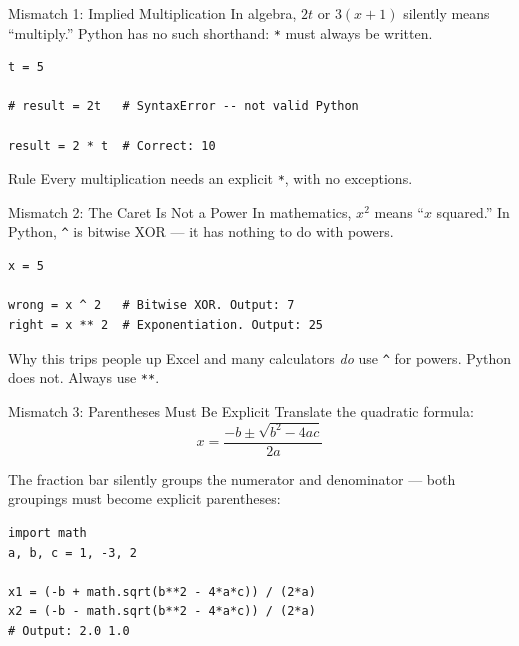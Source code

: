 \documentclass[9pt,aspectratio=169,xcolor=table]{beamer}
\begin{document}
\begin{frame}[fragile]{Mismatch 1: Implied Multiplication}
    \leavevmode
    In algebra, $2t$ or $3(x+1)$ silently means ``multiply.'' Python has
    \alert{no such shorthand}: \texttt{*} must always be written.

\begin{lstlisting}
t = 5

# result = 2t   # SyntaxError -- not valid Python

result = 2 * t  # Correct: 10
\end{lstlisting}

    \vspace{2mm}
    \begin{alertblock}{Rule}
        Every multiplication needs an explicit \texttt{*}, with no
        exceptions.
    \end{alertblock}
\end{frame}

\begin{frame}[fragile]{Mismatch 2: The Caret Is Not a Power}
    \leavevmode
    In mathematics, $x^2$ means ``$x$ squared.'' In Python, \texttt{\^{}}
    is \alert{bitwise XOR} --- it has nothing to do with powers.

\begin{lstlisting}
x = 5

wrong = x ^ 2   # Bitwise XOR. Output: 7
right = x ** 2  # Exponentiation. Output: 25
\end{lstlisting}

    \vspace{2mm}
    \begin{alertblock}{Why this trips people up}
        Excel and many calculators \emph{do} use \texttt{\^{}} for
        powers. Python does not. Always use \texttt{**}.
    \end{alertblock}
\end{frame}

\begin{frame}[fragile]{Mismatch 3: Parentheses Must Be Explicit}
    \leavevmode
    Translate the quadratic formula:
    \[
    x = \frac{-b \pm \sqrt{b^2 - 4ac}}{2a}
    \]

    The fraction bar silently groups the numerator and denominator ---
    both groupings must become explicit parentheses:

\begin{lstlisting}
import math
a, b, c = 1, -3, 2

x1 = (-b + math.sqrt(b**2 - 4*a*c)) / (2*a)
x2 = (-b - math.sqrt(b**2 - 4*a*c)) / (2*a)
# Output: 2.0 1.0
\end{lstlisting}
\end{frame}
\end{document}
